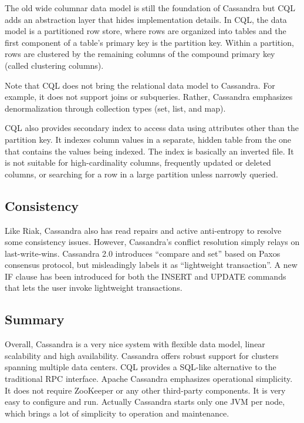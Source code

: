 \documentclass[12pt]{book}
\begin{document}
The old wide columnar data model is still the foundation of Cassandra but CQL adds an abstraction layer that hides implementation details. In CQL, the data model is a partitioned row store, where rows are organized into tables and the first component of a table's primary key is the partition key. Within a partition, rows are clustered by the remaining columns of the compound primary key (called clustering columns).

Note that CQL does not bring the relational data model to Cassandra. For example, it does not support joins or subqueries. Rather, Cassandra emphasizes denormalization through collection types (set, list, and map).

CQL also provides secondary index to access data using attributes other than the partition key. It indexes column values in a separate, hidden table from the one that contains the values being indexed. The index is basically an inverted file. It is not suitable for high-cardinality columns, frequently updated or deleted columns, or searching for a row in a large partition unless narrowly queried.

\subsection{Consistency}

Like Riak, Cassandra also has read repairs and active anti-entropy to resolve some consistency issues. However, Cassandra's conflict resolution simply relays on last-write-wins. Cassandra 2.0 introduces ``compare and set'' based on Paxos consensus protocol, but misleadingly labels it as ``lightweight transaction''. A new IF clause has been introduced for both the INSERT and UPDATE commands that lets the user invoke lightweight transactions.

\subsection{Summary}
Overall, Cassandra is a very nice system with flexible data model, linear scalability and high availability. 
Cassandra offers robust support for clusters spanning multiple data centers. CQL provides a SQL-like alternative to the traditional RPC interface.
Apache Cassandra emphasizes operational simplicity. It does not require ZooKeeper or any other third-party components. It is very easy to configure and run. Actually Cassandra starts only one JVM per node, which brings a lot of simplicity to operation and maintenance.
\end{document}
